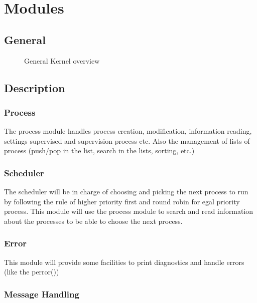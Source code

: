 \chapter{Modules}

\section{General}

\begin{figure}[h!]
  \begin{center}
	 
  \end{center}
  \caption{General Kernel overview}
  \label{fig:gen_kernel}
\end{figure}

\section{Description}
\subsection{Process}

The process module handles process creation, modification, information reading, settings supervised and supervision process etc. Also the management of lists of process (push/pop in the list, search in the lists, sorting, etc.)

\subsection{Scheduler}

The scheduler will be in charge of choosing and picking the next process to run by following the rule of higher priority first and round robin for egal priority process.
This module will use the process module to search and read information about the processes to be able to choose the next process.

\subsection{Error}

This module will provide some facilities to print diagnostics and handle errors (like the perror())

\subsection{Message Handling}

